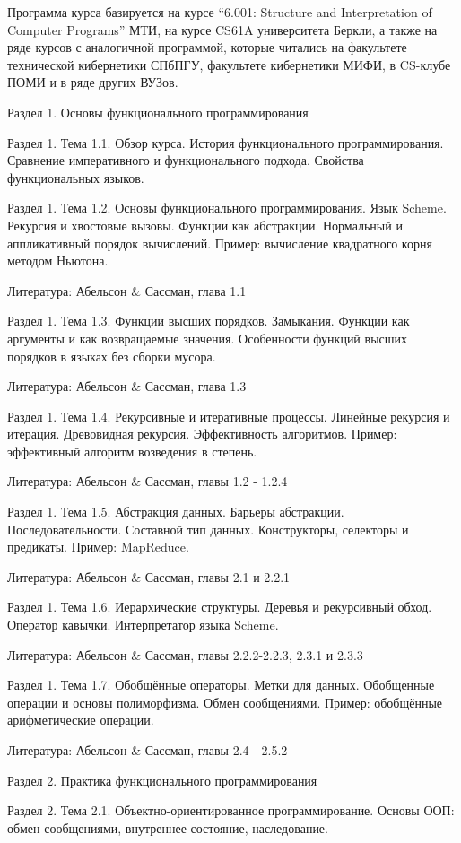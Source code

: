 Программа курса базируется на курсе ``6.001: Structure and Interpretation of
Computer Programs'' МТИ, на курсе CS61A университета Беркли, а также на ряде
курсов с аналогичной программой, которые читались на факультете технической
кибернетики СПбПГУ, факультете кибернетики МИФИ, в CS-клубе ПОМИ и в ряде
других ВУЗов.


Раздел 1. Основы функционального программирования

Раздел 1. Тема 1.1. Обзор курса. История функционального программирования.
Сравнение императивного и функционального подхода. Свойства функциональных
языков.


Раздел 1. Тема 1.2. Основы функционального программирования.
Язык Scheme. Рекурсия и хвостовые вызовы. Функции как абстракции. 
Нормальный и аппликативный порядок вычислений. Пример: вычисление 
квадратного корня методом Ньютона. 

Литература: Абельсон & Сассман, глава 1.1


Раздел 1. Тема 1.3. Функции высших порядков. Замыкания.
Функции как аргументы и как возвращаемые значения. Особенности функций
высших порядков в языках без сборки мусора.

Литература: Абельсон & Сассман, глава 1.3


Раздел 1. Тема 1.4. Рекурсивные и итеративные процессы.
Линейные рекурсия и итерация. Древовидная рекурсия. Эффективность алгоритмов.
Пример: эффективный алгоритм возведения в степень.

Литература: Абельсон & Сассман, главы 1.2 - 1.2.4


Раздел 1. Тема 1.5. Абстракция данных.
Барьеры абстракции. Последовательности. Составной тип данных. Конструкторы,
селекторы и предикаты. Пример: MapReduce.

Литература: Абельсон & Сассман, главы 2.1 и 2.2.1


Раздел 1. Тема 1.6. Иерархические структуры.
Деревья и рекурсивный обход. Оператор кавычки. Интерпретатор языка Scheme.

Литература: Абельсон & Сассман, главы 2.2.2-2.2.3, 2.3.1 и 2.3.3


Раздел 1. Тема 1.7. Обобщённые операторы.
Метки для данных. Обобщенные операции и основы полиморфизма. Обмен сообщениями.
Пример: обобщённые арифметические операции.

Литература: Абельсон & Сассман, главы 2.4 - 2.5.2


Раздел 2. Практика функционального программирования

Раздел 2. Тема 2.1. Объектно-ориентированное программирование.
Основы ООП: обмен сообщениями, внутреннее состояние, наследование.

